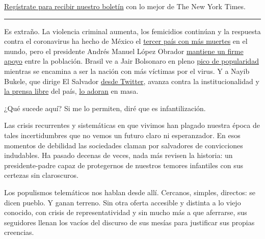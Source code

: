 \href{https://www.nytimes3xbfgragh.onion/newsletters/el-times}{Regístrate
para recibir nuestro boletín} con lo mejor de The New York Times.

\begin{center}\rule{0.5\linewidth}{\linethickness}\end{center}

Es extraño. La violencia criminal aumenta, los femicidios continúan y la
respuesta contra el coronavirus ha hecho de México el
\href{https://www.nytimes3xbfgragh.onion/es/interactive/2020/espanol/america-latina/coronavirus-en-mexico.html}{tercer
país con más muertes} en el mundo, pero el presidente Andrés Manuel
López Obrador
\href{https://www.animalpolitico.com/2020/08/arpobacion-amlo-reprobado-uso-cubrebocas/}{mantiene
un firme apoyo} entre la población. Brasil ve a Jair Bolsonaro en pleno
\href{https://www.reuters.com/article/us-brazil-politics/brazils-bolsonaro-gains-more-popular-approval-says-datafolha-poll-idUSKCN25A1JX?emci=a2e2c5ff-f6de-ea11-8b03-00155d0394bb\&emdi=1b6d81c3-f8de-ea11-8b03-00155d0394bb\&ceid=4606001}{pico
de popularidad} mientras se encamina a ser la nación con más víctimas
por el virus. Y a Nayib Bukele, que dirige El Salvador
\href{https://www.nytimes3xbfgragh.onion/es/2020/04/20/espanol/opinion/bukele-el-salvador-virus.html}{desde
Twitter}, avanza contra la institucionalidad y
\href{https://elfaro.net/es/202007/columnas/24691/Bukele-amenaza-al-periodismo.htm}{la
prensa libre} del país,
\href{https://www.laprensagrafica.com/lpgdatos/Bukele-cierra-su-primer-ano-de-trabajo-con-alta-aprobacion-20200523-0072.html}{lo
adoran} en masa.

¿Qué sucede aquí? Si me lo permiten, diré que es infantilización.

Las crisis recurrentes y sistemáticas en que vivimos han plagado nuestra
época de tales incertidumbres que no vemos un futuro claro ni
esperanzador. En esos momentos de debilidad las sociedades claman por
salvadores de convicciones indudables. Ha pasado decenas de veces, nada
más revisen la historia: un presidente-padre capaz de protegernos de
nuestros temores infantiles con sus certezas sin claroscuros.

Los populismos telemáticos nos hablan desde allí. Cercanos, simples,
directos: se dicen pueblo. Y ganan terreno. Sin otra oferta accesible y
distinta a lo viejo conocido, con crisis de representatividad y sin
mucho más a que aferrarse, sus seguidores llenan los vacíos del discurso
de sus mesías para justificar sus propias creencias.

